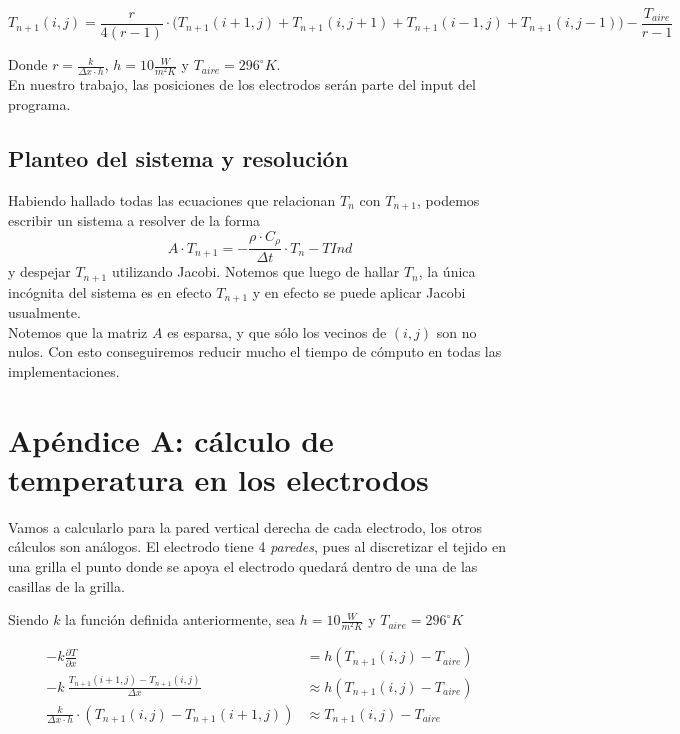 \documentclass[a4paper]{article}
\begin{document}
$$T_{n+1}(i,j) = \frac{r}{4(r-1)} \cdot \big( T_{n+1}(i+1,j) + T_{n+1}(i,j+1) + T_{n+1}(i-1,j) + T_{n+1}(i,j-1)\big) - \frac{T_{aire}}{r-1}$$

Donde $r = \frac{k}{\Delta x \cdot h}$, $h = 10 \frac{W}{m^2 K}$ y $T_{aire} = 296 ^\circ K$.\\ 

En nuestro trabajo, las posiciones de los electrodos serán parte del input del programa.

\subsection{Planteo del sistema y resolución}

Habiendo hallado todas las ecuaciones que relacionan $T_n$ con $T_{n+1}$, podemos escribir un sistema a resolver de la forma $$A \cdot T_{n+1} = -\frac{\rho \cdot C_\rho}{\Delta t} \cdot T_n - TInd$$ y despejar $T_{n+1}$ utilizando Jacobi. Notemos que luego de hallar $T_n$, la única incógnita del sistema es en efecto $T_{n+1}$ y en efecto se puede aplicar Jacobi usualmente.\\

Notemos que la matriz $A$ es esparsa, y que sólo los vecinos de $(i,j)$ son no nulos. Con esto conseguiremos reducir mucho el tiempo de cómputo en todas las implementaciones.

\newpage
\section{Apéndice A: cálculo de temperatura en los electrodos}

Vamos a calcularlo para la pared vertical derecha de cada electrodo, los otros cálculos son análogos. El electrodo tiene 4 \textit{paredes}, pues al discretizar el tejido en una grilla el punto donde se apoya el electrodo quedará dentro de una de las casillas de la grilla.

Siendo $k$ la función definida anteriormente, sea $h = 10 \frac{W}{m^2 K}$ y $T_{aire} = 296 ^\circ K$

\begin{equation*}
\begin{aligned}
-k \frac{\partial T}{\partial x} & = h (T_{n+1}(i,j) -  T_{aire}) \\
-k \ \frac{T_{n+1}(i+1,j) - T_{n+1}(i,j)}{\Delta x} & \approx h (T_{n+1}(i,j) -  T_{aire}) \\
\frac{k}{\Delta x \cdot h} \cdot (T_{n+1}(i,j) - T_{n+1}(i+1,j)) & \approx T_{n+1}(i,j) -  T_{aire}
\end{aligned}
\end{equation*}
\end{document}
